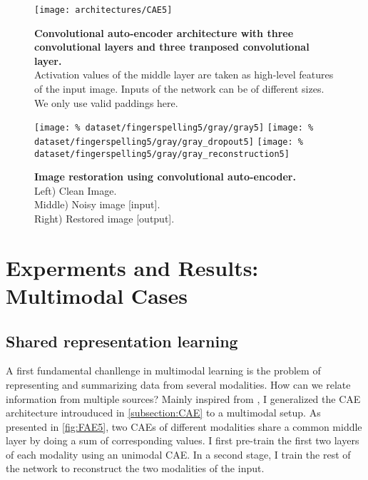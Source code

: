 \begin{figure}[H]
  \centering
  \texttt{[image: architectures/CAE5]}
  \caption{%
    \textbf{Convolutional auto-encoder architecture with 
      three convolutional layers and three tranposed convolutional
      layer.}\\[0.1em]
    Activation values of the middle layer are taken as 
      high-level features of the input image. Inputs of the network
      can be of different sizes. We only use valid paddings here.}
  \label{fig:CAE5}
\end{figure}

\begin{figure}[H]
  \centering
  \hfill
  \texttt{[image: \%
    dataset/fingerspelling5/gray/gray5]}
  \hfill
  \texttt{[image: \%
    dataset/fingerspelling5/gray/gray\_dropout5]}
  \hfill
  \texttt{[image: \%
    dataset/fingerspelling5/gray/gray\_reconstruction5]}
  \caption{%
    \textbf{Image restoration using convolutional auto-encoder.}\\[0.1em]
      Left) Clean Image.\\[0.1em]
      Middle) Noisy image [input].\\[0.1em]
      Right) Restored image [output].}
  \label{fig:image_restoration}
\end{figure}

\section{Experments and Results: Multimodal Cases} \label{section:multi}

\subsection{Shared representation learning} \label{subsection:shared}

A first fundamental chanllenge in multimodal learning is the problem
of representing and summarizing data from several modalities.
How can we relate information from multiple sources?
Mainly inspired from \cite{J. Ngiam 2011, A. Droniou 2014},
I generalized the CAE architecture introuduced in \ref{subsection:CAE}
to a multimodal setup. As presented in \autoref{fig:FAE5}, two CAEs
of different modalities share a common middle layer by doing a sum
of corresponding values. I first pre-train the first two layers
of each modality using an unimodal CAE. In a second stage, I train the
rest of the network to reconstruct the two modalities of the input.

